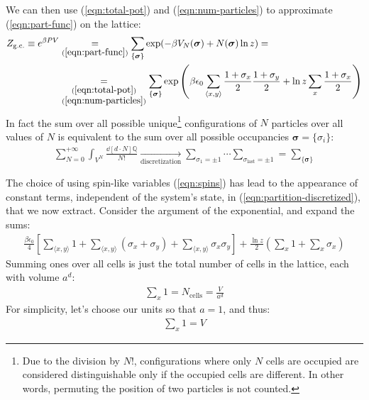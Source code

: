 \documentclass[../template.tex]{subfiles}
\begin{document}
We can then use (\ref{eqn:total-pot}) and (\ref{eqn:num-particles}) to approximate (\ref{eqn:part-func}) on the lattice:
\begin{align}\nonumber
    Z_{\mathrm{g.c.}} \equiv e^{\beta P V} &\underset{(\ref{eqn:part-func})}{=} \sum_{\{\bm{\sigma}\}} \exp(-\beta V_N(\bm{\sigma}) + N(\bm{\sigma}) \ln z) =\\
    &\underset{\substack{(\ref{eqn:total-pot})\\(\ref{eqn:num-particles})}}{=} \sum_{\{\bm{\sigma}\}} \exp \left(\beta \epsilon_0 \sum_{\langle x,y \rangle} \frac{1+\sigma_x}{2} \frac{1+\sigma_y}{2} + \ln z \sum_x \frac{1+\sigma_x}{2}   \right) \label{eqn:partition-discretized}
\end{align}
In fact the sum over all possible unique\footnote{Due to the division by $N!$, configurations where only $N$ cells are occupied are considered distinguishable only if the occupied cells are different. In other words, permuting the position of two particles is not counted.} configurations of $N$ particles over all values of $N$ is equivalent to the sum over all possible occupancies $\bm{\sigma} = \{\sigma_i\}$:
\begin{align*}
    \sum_{N=0}^{+\infty} \int_{V^N} \frac{\dd[d \cdot N]{\mathbb{Q}}}{N!} \xrightarrow[\text{discretization}]{} \sum_{\sigma_1 = \pm 1} \cdots \sum_{\sigma_\mathrm{last}  = \pm 1} = \sum_{\{\bm{\sigma}\}}
\end{align*}


\medskip

The choice of using spin-like variables (\ref{eqn:spins}) has lead to the appearance of constant terms, independent of the system's state, in (\ref{eqn:partition-discretized}), that we now extract. Consider the argument of the exponential, and expand the sums:
\begin{align}\label{eqn:expon}
    \frac{\beta \epsilon_0}{4} \left[\sum_{\langle x,y \rangle} 1 + \sum_{\langle x,y \rangle} (\sigma_x + \sigma_y) + \sum_{\langle x,y \rangle}\sigma_x \sigma_y\right] + \frac{\ln z}{2} \left(\sum_x 1 + \sum_x \sigma_x\right)
\end{align}
Summing ones over all cells is just the total number of cells in the lattice, each with volume $a^d$:
\begin{align*}
    \sum_x 1 = N_{\mathrm{cells}} = \frac{V}{a^d} 
\end{align*}
For simplicity, let's choose our units so that $a=1$, and thus:
\begin{align}\label{eqn:sum1}
    \sum_x 1 = V
\end{align}
\end{document}
